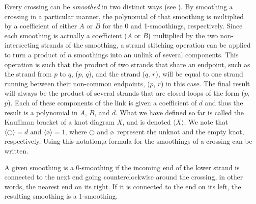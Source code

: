\begin{paper}
Every crossing can be \textit{smoothed} in two distinct ways (see
\figSmoothings).
By smoothing a crossing in a particular manner, the polynomial of that smoothing
is multiplied by a coefficient of either $A$ or $B$ for the 0 and 1-smoothings,
respectively.
Since each smoothing is actually a coefficient ($A$ or $B$) multiplied by the
two non-intersecting strands of the smoothing, a strand stitching operation can
be applied to turn a product of $n$ smoothings into an unlink of several
components.
This operation is such that the product of two strands that share an endpoint,
such as the strand from $p$ to $q$, ($p$, $q$), and the strand ($q$, $r$), will
be equal to one strand running between their non-common endpoints, ($p$, $r$) in
this case.
The final result will always be the product of several strands that are closed
loops of the form ($p$, $p$).
Each of these components of the link is given a coefficient of $d$ and thus the
result is a polynomial in $A$, $B$, and $d$.
What we have defined so far is called the Kauffman bracket of a knot diagram
$X$, and is denoted $\langle X\rangle$.
We note that $\langle\bigcirc\rangle=d$ and $\langle$\o$\rangle=1$, where
$\bigcirc$ and \o~represent the unknot and the empty knot, respectively.
Using this notation,a formula for the smoothings of a crossing can be written.


A given smoothing is a 0-smoothing if the incoming end of the lower strand is
connected to the next end going counterclockwise around the crossing, in other
words, the nearest end on its right.
If it is connected to the end on its left, the resulting smoothing is a
1-smoothing.


\end{paper}
